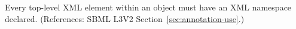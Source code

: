 Every top-level XML element within an \Annotation object must have an XML
namespace declared.  (References: SBML L3V2 Section~\ref{sec:annotation-use}.)
